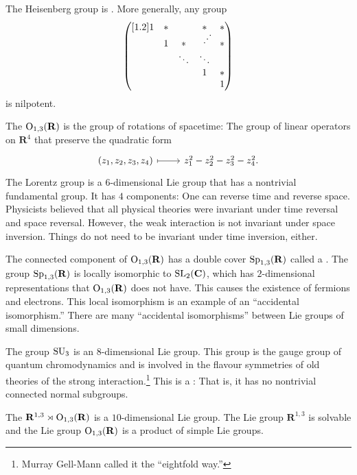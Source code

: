 \documentclass [11 pt, twoside] {article}
\begin{document}
The Heisenberg group is . More generally, any group
\begin{align*} %
	\mat{1&*&&*&*\\
		      &1&*& \hbox to .2em{\hss\scalebox{1}[1] {\rotatebox[origin=c]{90}{$\ddots$}}\hss} &*\\
		      &&\ddots&\ddots\\
		      &&&1&*\\
		      &&&&1} 
\end{align*}
is nilpotent.

The  $\operatorname{O}_{1,3}(\mathbf{R})$ is the group of rotations of spacetime: The group of linear operators on $\mathbf{R}^{4}$ that preserve the quadratic form
\[
\begin{tikzcd}
	(z_1,z_2,z_3,z_4)\ar[r,mapsto]& z_1^{2} - z_2^{2}-z_3^{2}-z_4^{2}.
\end{tikzcd}
\]
The Lorentz group is a $6$-dimensional Lie group that has a nontrivial fundamental group.
It has $4$ components: One can reverse time and reverse space.
Physicists believed that all physical theories were invariant under time reversal and space reversal. However, the weak interaction is not invariant under space inversion. Things do not need to be invariant under time inversion, either. 

The connected component of $\operatorname{O}_{1,3}(\mathbf{R})$ has a double cover $\operatorname{Sp}_{1,3}(\mathbf{R})$ called a .
The group $\operatorname{Sp}_{1,3}(\mathbf{R})$ is locally isomorphic to $\operatorname{SL}_{2}(\mathbf{C})$, which has $2$-dimensional representations that $\operatorname{O}_{1,3}(\mathbf{R})$ does not have. This causes the existence of fermions and electrons.
This local isomorphism is an example of an ``accidental isomorphism.'' There are many ``accidental isomorphisms'' between Lie groups of small dimensions.

The group $\operatorname{SU}_3$ is an $8$-dimensional Lie group. This group is the gauge group of quantum chromodynamics and is involved in the flavour symmetries of old theories of the strong interaction.\footnote{Murray Gell-Mann called it the ``eightfold way.''}
This is a : That is, it has no nontrivial connected normal subgroups.

The  $\mathbf{R}^{1,3} \rtimes \operatorname{O}_{1,3}(\mathbf{R})$ is a $10$-dimensional Lie group.
The Lie group $\mathbf{R}^{1,3}$ is solvable and the Lie group $\operatorname{O}_{1,3}(\mathbf{R})$ is a product of simple Lie groups.
\end{document}
